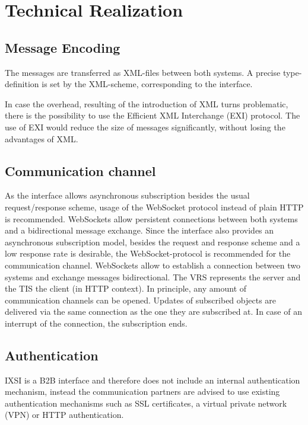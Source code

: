 \chapter{Technical Realization}
\label{sec:TechnischeRealisierung}


\section{Message Encoding}
The messages are transferred as XML-files between both systems. A precise type-definition is set by the XML-scheme, corresponding to the interface.

In case the overhead, resulting of the introduction of XML turns problematic, there is the possibility to use the Efficient XML Interchange (EXI) protocol. The use of EXI would reduce the size of messages significantly, without losing the advantages of XML. 

\section{Communication channel}
As the interface allows asynchronous subscription besides the usual request/response scheme, usage of the WebSocket protocol instead of plain HTTP is recommended.
WebSockets allow persistent connections between both systems and a bidirectional message exchange. Since the interface also provides an asynchronous subscription model, besides the request and response scheme and a low response rate is desirable, the WebSocket-protocol is recommended for the communication channel. WebSockets allow to establish a connection between two systems and exchange messages bidirectional. The VRS represents the server and the TIS the client (in HTTP context). In principle, any amount of communication channels can be opened. Updates of subscribed objects are delivered via the same connection as the one they are subscribed at. In case of an interrupt of the connection, the subscription ends.

\section{Authentication}
IXSI is a B2B interface and therefore does not include an internal authentication mechanism, instead the communication partners are advised to use existing authentication mechanisms such as SSL certificates, a virtual private network (VPN) or HTTP authentication.

